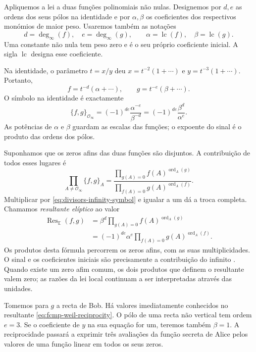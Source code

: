 Apliquemos a lei a duas funções polinomiais não nulas. Designemos
por \(d,e\) as ordens dos seus pólos na identidade e por
\(\alpha,\beta\) os coeficientes dos respectivos monómios de
maior peso. Usaremos também as notações
\[
 d=\deg_\infty(f),\quad e=\deg_\infty(g),
 \qquad \alpha=\operatorname{lc}(f),\quad
 \beta=\operatorname{lc}(g).
\]
Uma constante não nula tem peso zero e é o seu próprio coeficiente
inicial. A sigla \(\operatorname{lc}\) designa esse coeficiente.

Na identidade, o parâmetro
\(t=x/y\) deu \(x=t^{-2}(1+\cdots)\) e
\(y=t^{-3}(1+\cdots)\). Portanto,
\[
 f=t^{-d}(\alpha+\cdots),\qquad
 g=t^{-e}(\beta+\cdots).
\]
O símbolo na identidade é exactamente
\begin{equation}
 \{f,g\}_{\mathcal O_\infty}
 =(-1)^{de}\frac{\alpha^{-e}}{\beta^{-d}}
 =(-1)^{de}\frac{\beta^d}{\alpha^e}.
 \label{eq:divisors-infinity-symbol}
\end{equation}
As potências de \(\alpha\) e \(\beta\) guardam as escalas das
funções; o expoente do sinal é o produto das ordens dos pólos.

Suponhamos que os zeros afins das duas funções são disjuntos. A
contribuição de todos esses lugares é
\[
 \prod_{A\ne\mathcal O_\infty}\{f,g\}_A
 =\frac{\displaystyle\prod_{g(A)=0}f(A)^{\operatorname{ord}_A(g)}}
        {\displaystyle\prod_{f(A)=0}g(A)^{\operatorname{ord}_A(f)}}.
\]
Multiplicar por \eqref{eq:divisors-infinity-symbol} e igualar a um
dá a troca completa. Chamamos \emph{resultante elíptico} ao valor
\begin{align}
 \operatorname{Res}_{\mathbb E}(f,g)
 &=\beta^d\prod_{g(A)=0}f(A)^{\operatorname{ord}_A(g)}\nonumber\\
 &=(-1)^{de}\alpha^e
      \prod_{f(A)=0}g(A)^{\operatorname{ord}_A(f)}.
 \label{eq:fcmp-weil-reciprocity}
\end{align}
Os produtos desta fórmula percorrem os zeros afins, com as suas
multiplicidades. O sinal e os coeficientes iniciais são precisamente
a contribuição do infinito \cite{eagen-divisors}. Quando existe
um zero afim comum, os dois produtos que definem o resultante valem
zero; as razões da lei local continuam a ser interpretadas através
das unidades.

Tomemos para \(g\) a recta de Bob. Há valores imediatamente
conhecidos no resultante \eqref{eq:fcmp-weil-reciprocity}. O pólo de
uma recta não vertical tem ordem \(e=3\). Se o coeficiente de \(y\)
na sua equação for um, teremos também \(\beta=1\). A reciprocidade
passará a exprimir três avaliações da função secreta de Alice pelos
valores de uma função linear em todos os seus zeros.

